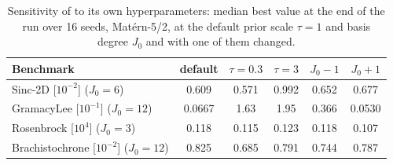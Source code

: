 \begin{table}[t]
\centering
\caption{Sensitivity of \method{} to its own hyperparameters: median best value at the end of the run over 16 seeds, Mat\'ern-5/2, at the default prior scale $\tau = 1$ and basis degree $J_0$ and with one of them changed.}
\label{tab:sensitivity}
\footnotesize
\begin{tabular}{lccccc}
\toprule
Benchmark & default & $\tau = 0.3$ & $\tau = 3$ & $J_0 - 1$ & $J_0 + 1$ \\
\midrule
Sinc-2D [$10^{-2}$] ($J_0 = 6$) & 0.609 & 0.571 & 0.992 & 0.652 & 0.677 \\
GramacyLee [$10^{-1}$] ($J_0 = 12$) & 0.0667 & 1.63 & 1.95 & 0.366 & 0.0530 \\
Rosenbrock [$10^{4}$] ($J_0 = 3$) & 0.118 & 0.115 & 0.123 & 0.118 & 0.107 \\
Brachistochrone [$10^{-2}$] ($J_0 = 12$) & 0.825 & 0.685 & 0.791 & 0.744 & 0.787 \\
\bottomrule
\end{tabular}
\end{table}
